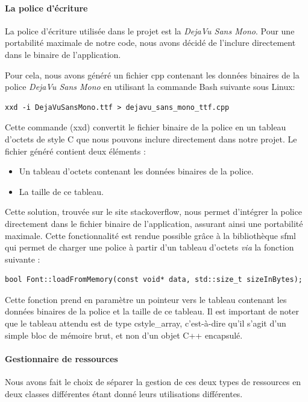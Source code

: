 \paragraph{La police d'écriture}
La police d'écriture utilisée dans le projet est la \textit{DejaVu Sans Mono}.
Pour une portabilité maximale de notre code, nous avons décidé de l'inclure directement dans le binaire de l'application.

Pour cela, nous avons généré un fichier \gls{cpp} contenant les données binaires de la police \textit{DejaVu Sans Mono} en utilisant la commande Bash suivante sous Linux:
\begin{lstlisting}[style=BashStyle,label={lst:generation_dejavusansmonottf_h}]
xxd -i DejaVuSansMono.ttf > dejavu_sans_mono_ttf.cpp
\end{lstlisting}
Cette commande (\gls{xxd}) convertit le fichier binaire de la police en un tableau d'octets de style C que nous pouvons inclure directement dans notre projet.
Le fichier généré contient deux éléments :
\begin{itemize}
    \item Un tableau d'octets contenant les données binaires de la police.
    \item La taille de ce tableau.
\end{itemize}

Cette solution, trouvée sur le site \gls{stackoverflow}\cite{stackoverflow_embed_font}, nous permet d'intégrer la police directement dans le fichier binaire de l'application, assurant ainsi une portabilité maximale.
Cette fonctionnalité est rendue possible grâce à la bibliothèque \gls{sfml} qui permet de charger une police à partir d'un tableau d'octets \textit{via} la fonction suivante :

\begin{lstlisting}[style=CStyle,label={lst:load_from_memory}]
bool Font::loadFromMemory(const void* data, std::size_t sizeInBytes);
\end{lstlisting}

Cette fonction prend en paramètre un pointeur vers le tableau contenant les données binaires de la police et la taille de ce tableau.
Il est important de noter que le tableau attendu est de type \gls{cstyle_array}, c'est-à-dire qu'il s'agit d'un simple bloc de mémoire brut, et non d'un objet C++ encapsulé.

\paragraph{Gestionnaire de ressources}
Nous avons fait le choix de séparer la gestion de ces deux types de ressources en deux classes différentes étant donné leurs utilisations différentes.


